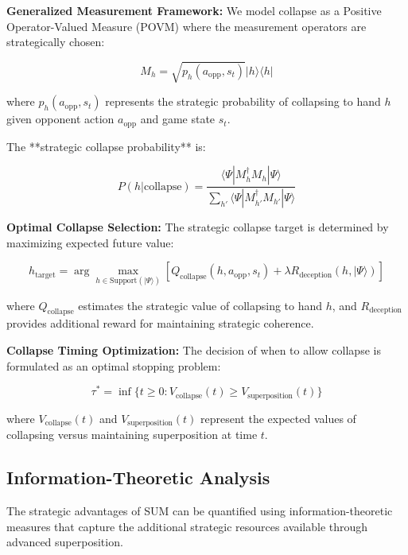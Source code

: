 \documentclass[11pt,a4paper]{article}
\begin{document}
\textbf{Generalized Measurement Framework:} We model collapse as a Positive Operator-Valued Measure (POVM) where the measurement operators are strategically chosen:

\begin{equation}
M_h = \sqrt{p_h(a_{\text{opp}}, s_t)} |h\rangle\langle h|
\end{equation}

where $p_h(a_{\text{opp}}, s_t)$ represents the strategic probability of collapsing to hand $h$ given opponent action $a_{\text{opp}}$ and game state $s_t$.

The **strategic collapse probability** is:

\begin{equation}
P(h | \text{collapse}) = \frac{\langle \Psi | M_h^\dagger M_h | \Psi \rangle}{\sum_{h'} \langle \Psi | M_{h'}^\dagger M_{h'} | \Psi \rangle}
\end{equation}

\textbf{Optimal Collapse Selection:} The strategic collapse target is determined by maximizing expected future value:

\begin{equation}
h_{\text{target}} = \arg\max_{h \in \text{Support}(|\Psi\rangle)} \left[Q_{\text{collapse}}(h, a_{\text{opp}}, s_t) + \lambda R_{\text{deception}}(h, |\Psi\rangle)\right]
\end{equation}

where $Q_{\text{collapse}}$ estimates the strategic value of collapsing to hand $h$, and $R_{\text{deception}}$ provides additional reward for maintaining strategic coherence.

\textbf{Collapse Timing Optimization:} The decision of when to allow collapse is formulated as an optimal stopping problem:

\begin{equation}
\tau^* = \inf\{t \geq 0 : V_{\text{collapse}}(t) \geq V_{\text{superposition}}(t)\}
\end{equation}

where $V_{\text{collapse}}(t)$ and $V_{\text{superposition}}(t)$ represent the expected values of collapsing versus maintaining superposition at time $t$.

\subsection{Information-Theoretic Analysis}

The strategic advantages of SUM can be quantified using information-theoretic measures that capture the additional strategic resources available through advanced superposition.
\end{document}
